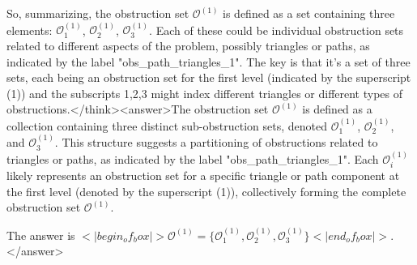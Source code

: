 So, summarizing, the obstruction set $\mathcal{O}^{(1)}$ is defined as a set containing three elements: $\mathcal{O}^{(1)}_1$, $\mathcal{O}^{(1)}_2$, $\mathcal{O}^{(1)}_3$. Each of these could be individual obstruction sets related to different aspects of the problem, possibly triangles or paths, as indicated by the label "obs_path_triangles_1". The key is that it's a set of three sets, each being an obstruction set for the first level (indicated by the superscript (1)) and the subscripts 1,2,3 might index different triangles or different types of obstructions.</think><answer>The obstruction set $\mathcal{O}^{(1)}$ is defined as a collection containing three distinct sub-obstruction sets, denoted $\mathcal{O}^{(1)}_1$, $\mathcal{O}^{(1)}_2$, and $\mathcal{O}^{(1)}_3$. This structure suggests a partitioning of obstructions related to triangles or paths, as indicated by the label "obs_path_triangles_1". Each $\mathcal{O}^{(1)}_i$ likely represents an obstruction set for a specific triangle or path component at the first level (denoted by the superscript (1)), collectively forming the complete obstruction set $\mathcal{O}^{(1)}$.  

The answer is $<|begin_of_box|>\mathcal{O}^{(1)} = \{\mathcal{O}^{(1)}_1, \mathcal{O}^{(1)}_2, \mathcal{O}^{(1)}_3\}<|end_of_box|>$.</answer>